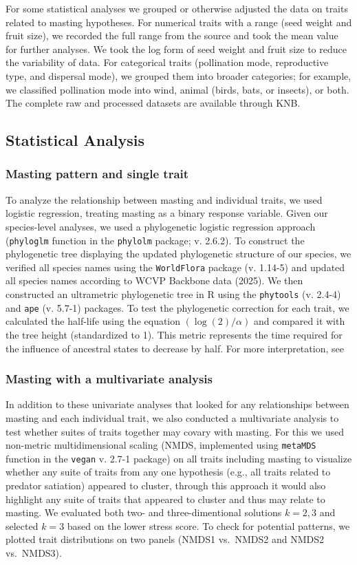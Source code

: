 \documentclass{article}
\begin{document}
For some statistical analyses we grouped or otherwise adjusted the data on traits related to masting hypotheses. For numerical traits with a range (seed weight and fruit size), we recorded the full range from the source and took the mean value for further analyses. We took the log form of seed weight and fruit size to reduce the variability of data.
For categorical traits (pollination mode, reproductive type, and dispersal mode), we grouped them into broader categories; for example, we classified pollination mode into wind, animal (birds, bats, or insects), or both. The complete raw and processed datasets are available through KNB.

\subsection{Statistical Analysis}
\subsubsection{Masting pattern and single trait}

To analyze the relationship between masting and individual traits, we used logistic regression, treating masting as a binary response variable. Given our species-level analyses, we used a phylogenetic logistic regression approach (\texttt{phyloglm} function in the \texttt{phylolm} package; v. 2.6.2). To construct the phylogenetic tree displaying the updated phylogenetic structure of our species, we verified all species names using the  \texttt{WorldFlora} package (v. 1.14-5) and updated all species names according to WCVP Backbone data (2025). We then constructed an ultrametric phylogenetic tree in R using the \texttt{phytools} (v. 2.4-4) and \texttt{ape} (v. 5.7-1) packages. To test the phylogenetic correction for each trait, we calculated the half-life using the equation $(\log(2)/\alpha)$ and compared it with the tree height (standardized to 1). This metric represents the time required for the influence of ancestral states to decrease by half. For more interpretation, see \cite{cooper2016cautionary}
\subsubsection{Masting with a multivariate analysis}
In addition to these univariate analyses that looked for any relationships between masting and each individual trait, we also conducted a multivariate analysis to test whether suites of traits together may covary with masting. For this we used non-metric multidimensional scaling (NMDS, implemented using \texttt{metaMDS} function in the \texttt{vegan} v. 2.7-1 package) on all traits including masting to visualize whether any suite of traits from any one hypothesis (e.g., all traits related to predator satiation) appeared to cluster, through this approach it would also highlight any suite of traits that appeared to cluster and thus may relate to masting. We evaluated both two- and three-dimentional solutions \(k = 2, 3\) and selected \(k = 3\) based on the lower stress score. To check for potential patterns, we plotted trait distributions on two panels (NMDS1 vs.\ NMDS2 and NMDS2 vs.\ NMDS3).
\end{document}
